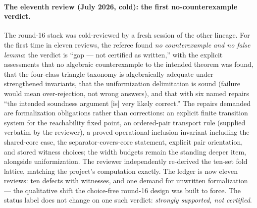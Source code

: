 \documentclass[
]{ceurart}
\theoremstyle{definition}
\begin{document}
\paragraph{The eleventh review (July 2026, cold): the first no-counterexample
verdict.}
The round-16 stack was cold-reviewed by a fresh session of the other
lineage.  For the first time in eleven reviews, the referee found
\emph{no counterexample and no false lemma}: the verdict is ``gap ---
not certified as written,'' with the explicit assessments that no
algebraic counterexample to the intended theorem was found, that the
four-class triangle taxonomy is algebraically adequate under
strengthened invariants, that the uniformization delimitation is sound
(failure would mean over-rejection, not wrong answers), and that with
six named repairs ``the intended soundness argument [is] very likely
correct.''  The repairs demanded are formalization obligations rather
than corrections: an explicit finite transition system for the
reachability fixed point, an ordered-pair transport rule (supplied
verbatim by the reviewer), a proved operational-inclusion invariant
including the shared-core case, the separator-covers-core statement,
explicit pair orientation, and stored witness choices; the width
budgets remain the standing deeper item, alongside uniformization.  The
reviewer independently re-derived the ten-set fold lattice, matching
the project's computation exactly.  The ledger is now eleven reviews:
ten defects with witnesses, and one demand for unwritten formalization
--- the qualitative shift the choice-free round-16 design was built to
force.  The status label does not change on one such verdict:
\emph{strongly supported, not certified}.
\end{document}
